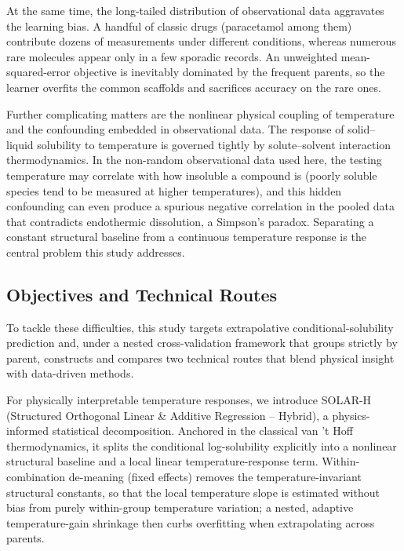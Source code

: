 At the same time, the long-tailed distribution of observational data aggravates the learning bias. A handful of classic drugs (paracetamol among them) contribute dozens of measurements under different conditions, whereas numerous rare molecules appear only in a few sporadic records. An unweighted mean-squared-error objective is inevitably dominated by the frequent parents, so the learner overfits the common scaffolds and sacrifices accuracy on the rare ones.

Further complicating matters are the nonlinear physical coupling of temperature and the confounding embedded in observational data\cite{pearl2009}. The response of solid--liquid solubility to temperature is governed tightly by solute--solvent interaction thermodynamics. In the non-random observational data used here, the testing temperature may correlate with how insoluble a compound is (poorly soluble species tend to be measured at higher temperatures), and this hidden confounding can even produce a spurious negative correlation in the pooled data that contradicts endothermic dissolution, a Simpson's paradox. Separating a constant structural baseline from a continuous temperature response is the central problem this study addresses\cite{vermeire2022,sensitivity2020}.

\subsection{Objectives and Technical Routes}

To tackle these difficulties, this study targets extrapolative conditional-solubility prediction and, under a nested cross-validation framework that groups strictly by parent\cite{varma2006}, constructs and compares two technical routes that blend physical insight with data-driven methods.

For physically interpretable temperature responses, we introduce SOLAR-H (Structured Orthogonal Linear \& Additive Regression -- Hybrid), a physics-informed statistical decomposition. Anchored in the classical van 't Hoff thermodynamics\cite{vermeire2022}, it splits the conditional log-solubility explicitly into a nonlinear structural baseline and a local linear temperature-response term. Within-combination de-meaning (fixed effects) removes the temperature-invariant structural constants, so that the local temperature slope is estimated without bias from purely within-group temperature variation; a nested, adaptive temperature-gain shrinkage then curbs overfitting when extrapolating across parents.

